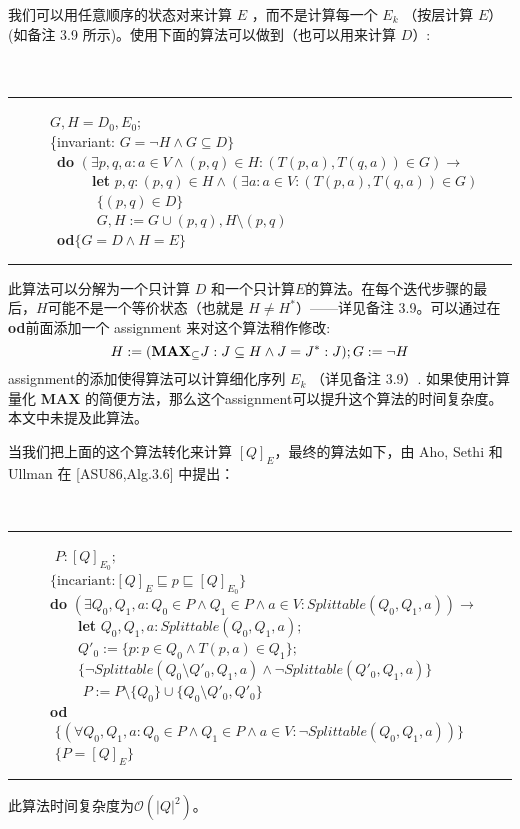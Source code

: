 我们可以用任意顺序的状态对来计算 $E$ ，而不是计算每一个 $E_k$ （按层计算 $E$）(如备注 3.9 所示)。使用下面的算法可以做到（也可以用来计算 $D$）:
\\
\\
\\
\rule{\textwidth}{1pt}
\mbox{　　　}$G,H=D_0,E_0$;\\
\mbox{　　　\{invariant:} $G= \neg H \land G \subseteq D \}$\\
\mbox{　　　 \textbf{do}} $ ( \exists p,q,a : a \in V \land (p,q) \in H : ( T(p,a) , T(q,a) ) \in G  ) \longrightarrow $ \\
\mbox{　　　　　　\textbf{let}} $ p,q :(p,q) \in H \land ( \exists a : a \in V :  ( T(p,a) , T(q,a) ) \in G   ) $ \\
\mbox{　　　　　　} $ \{  (p,q) \in D \}  $ \\
\mbox{　　　　　　} $ G,H:= G \cup {(p,q)},H \setminus {(p,q) } $ \\
\mbox{　　　 \textbf{od}}$ \{ G=D \land H=E \}$ \\
\rule{\textwidth}{1pt}
此算法可以分解为一个只计算 $D$ 和一个只计算$E$的算法。在每个迭代步骤的最后，$H$可能不是一个等价状态（也就是 $ H \not= H^* $）——详见备注 3.9。可以通过在\textbf{od}前面添加一个 assignment 来对这个算法稍作修改:
$$ H := (\mbox{\textbf{MAX}}_{\subseteq } J : J \subseteq H \land J = J ^* : J); G := \neg H $$
assignment的添加使得算法可以计算细化序列 $E_k$ （详见备注 3.9）. 如果使用计算量化 \textbf{MAX} 的简便方法，那么这个assignment可以提升这个算法的时间复杂度。本文中未提及此算法。

当我们把上面的这个算法转化来计算 $[Q]_E$，最终的算法如下，由 Aho, Sethi 和 Ullman 在 [ASU86,Alg.3.6] 中提出：
\newline

\\
\rule{\textwidth}{1pt}
\mbox{　　　} $P:[Q]_{E_0};$ \\
\mbox{　　　}$\{ \mbox{incariant:} [Q]_E \sqsubseteq p \sqsubseteq [Q]_{E_0} \}$ \\
\mbox{　　　\textbf{do}} $(\exists Q_0,Q_1,a : Q_0 \in P \land Q_1 \in P \land a \in V : Splittable (Q_0,Q_1,a)) \longrightarrow$ \\
\mbox{　　　　　\textbf{let}} $Q_0,Q_1,a:Splittable(Q_0,Q_1,a);$ \\
\mbox{　　　　　}$Q'_0 := \{ p:p\in Q_0 \land T(p,a) \in Q_1 \};$ \\
\mbox{　　　　　}$\{ \neg Splittable (Q_0 \setminus Q'_0 ,Q_1 ,a ) \land \neg Splittable (Q'_0,Q_1,a) \}$ \\
\mbox{　　　　　} $P := P \setminus \{Q_0\} \cup \{Q_0 \setminus Q'_0,Q'_0 \}$ \\
\mbox{　　　\textbf{od}}\\
\mbox{　　　} $ \{ (\forall Q_0,Q_1,a : Q_0 \in P \land Q_1 \in P \land a \in V : \neg Splittable (Q_0,Q_1,a))  \} $ \\
\mbox{　　　} $\{  P = [Q]_E \}$ \\
\rule{\textwidth}{1pt}
此算法时间复杂度为$\mathcal{O}(|Q|^2)$。

